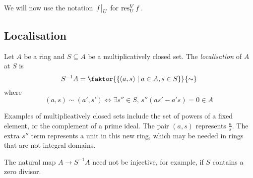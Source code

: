 We will now use the notation \( \eval{f}_U \) for \( \operatorname{res}^V_U f \).

\subsection{Localisation}
\begin{definition}
    Let \( A \) be a ring and \( S \subseteq A \) be a multiplicatively closed set.
    The \emph{localisation} of \( A \) at \( S \) is
    \[ S^{-1}A = \faktor{\qty{(a, s) \mid a \in A, s \in S}}{\sim} \]
    where
    \[ (a, s) \sim (a', s') \iff \exists s'' \in S,\, s''(as' - a's) = 0 \in A \]
\end{definition}
Examples of multiplicatively closed sets include the set of powers of a fixed element, or the complement of a prime ideal.
The pair \( (a, s) \) represents \( \frac{a}{s} \).
The extra \( s'' \) term represents a unit in this new ring, which may be needed in rings that are not integral domains.
\begin{remark}
    The natural map \( A \to S^{-1} A \) need not be injective, for example, if \( S \) contains a zero divisor.
\end{remark}

